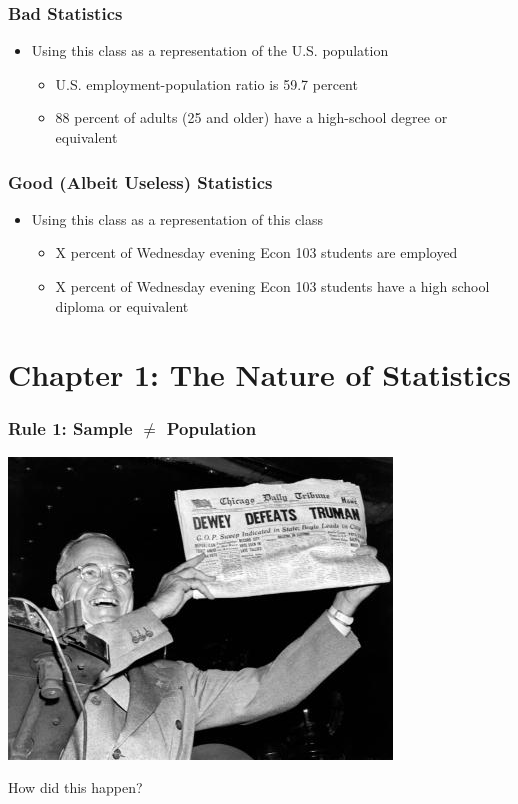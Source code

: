\documentclass{beamer}
\begin{document}
\begin{frame}
\frametitle{Bad Statistics}
	\begin{itemize}
		\item Using this class as a representation of the U.S. population
		\begin{itemize}
			\item U.S. employment-population ratio is 59.7 percent
			\item 88 percent of adults (25 and older) have a high-school degree or equivalent
		\end{itemize}
	\end{itemize}
\end{frame}

\begin{frame}
\frametitle{Good (Albeit Useless) Statistics}
	\begin{itemize}
		\item Using this class as a representation of this class
		\begin{itemize}
			\item X percent of Wednesday evening Econ 103 students are employed
			\item X percent of Wednesday evening Econ 103 students have a high school diploma 				or equivalent
		\end{itemize}
	\end{itemize}
\end{frame}

\section{Chapter 1: The Nature of Statistics}
\begin{frame}
\frametitle{Rule 1: Sample $\neq$ Population}
	\begin{center}
		\includegraphics[scale=0.5]{./images/truman.jpg}
	\end{center}
	\centering
	How did this happen?
\end{frame}
\end{document}
